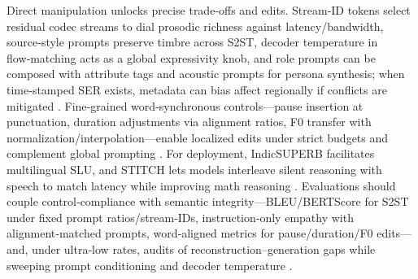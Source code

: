 Direct manipulation unlocks precise trade‑offs and edits. Stream‑ID tokens select residual codec streams to dial prosodic richness against latency/bandwidth, source‑style prompts preserve timbre across S2ST, decoder temperature in flow‑matching acts as a global expressivity knob, and role prompts can be composed with attribute tags and acoustic prompts for persona synthesis; when time‑stamped SER exists, metadata can bias affect regionally if conflicts are mitigated \cite{peng2024mslms2stmultitaskspeechlanguagemodeltext,yuan2024continuousspeechtokensmakesllmsrobustmul,wang2024blspemotowardsempatheticlargespeechlangu,wang2025incorporatingcontextualparalinguisticund}. Fine‑grained word‑synchronous controls—pause insertion at punctuation, duration adjustments via alignment ratios, F0 transfer with normalization/interpolation—enable localized edits under strict budgets and complement global prompting \cite{huang2023holisticcascadesystembenchmarkhumanevalu}. For deployment, IndicSUPERB facilitates multilingual SLU, and STITCH lets models interleave silent reasoning with speech to match latency while improving math reasoning \cite{entry2025indicsuperbspeechprocessinguniversalperf,chiang2025stitchsimultaneousthinkingtalkingchunked}. Evaluations should couple control‑compliance with semantic integrity—BLEU/BERTScore for S2ST under fixed prompt ratios/stream‑IDs, instruction‑only empathy with alignment‑matched prompts, word‑aligned metrics for pause/duration/F0 edits—and, under ultra‑low rates, audits of reconstruction–generation gaps while sweeping prompt conditioning and decoder temperature \cite{wang2024blspemotowardsempatheticlargespeechlangu,huang2023holisticcascadesystembenchmarkhumanevalu}.

